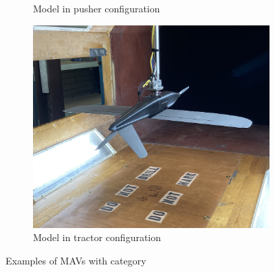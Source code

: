 \begin{figure}[H]
\begin{subfigure}[b]{0.3\textwidth}
             \caption{Model in pusher configuration}
             \label{fig:pusher}
     \end{subfigure}
     \hfill
     \begin{subfigure}[b]{0.3\textwidth}
             \centering
             \includegraphics[scale=0.05]{04_Methodology/Figs/tractors}
             \caption{Model in tractor configuration}
             \label{fig:tractors}
     \end{subfigure}
        \caption{Examples of MAVs with category}
        \label{fig:typesUsed}
\end{figure}

